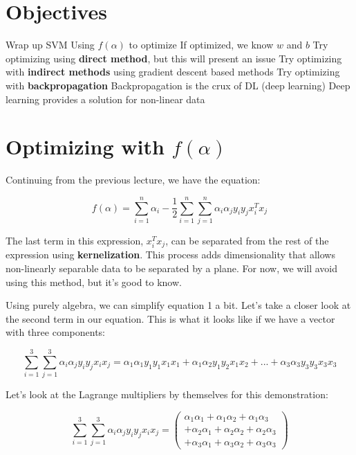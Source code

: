 \section*{Objectives}
\begin{outline}
    \1 Wrap up SVM
    \1 Using $f(\alpha)$ to optimize
        \2 If optimized, we know $w$ and $b$
    \1 Try optimizing using \textbf{direct method}, but this will present an issue
    \1 Try optimizing with \textbf{indirect methods} using gradient descent based methods
    \1 Try optimizing with \textbf{backpropagation}
        \2 Backpropagation is the crux of DL (deep learning)
        \2 Deep learning provides a solution for non-linear data 

\end{outline}

\section*{Optimizing with $f(\alpha)$}

Continuing from the previous lecture, we have the equation:

\begin{equation}
f(\alpha) = \sum\limits_{i=1}^{n} \alpha_i - \frac{1}{2} \sum\limits_{i=1}^{n} \sum\limits_{j=1}^{n} \alpha_i \alpha_j y_i y_j x_i^T x_j
\end{equation}

The last term in this expression, $x_i^T x_j$, can be separated from the rest of the expression using \textbf{kernelization}. This process adds dimensionality that allows non-linearly separable data to be separated by a plane. For now, we will avoid using this method, but it's good to know.

Using purely algebra, we can simplify equation 1 a bit. Let's take a closer look at the second term in our equation. This is what it looks like if we have a vector with three components:

\[
\sum\limits_{i=1}^{3} \sum\limits_{j=1}^{3} \alpha_i \alpha_j y_i y_j x_i x_j = \alpha_1\alpha_1y_1y_1x_1x_1 + \alpha_1\alpha_2y_1y_2x_1x_2 + ... + \alpha_3\alpha_3y_3y_3x_3x_3
\]

Let's look at the Lagrange multipliers by themselves for this demonstration:

\[
\sum\limits_{i=1}^{3} \sum\limits_{j=1}^{3} \alpha_i \alpha_j y_i y_j x_i x_j = 
\begin{pmatrix}
\alpha_1\alpha_1 + \alpha_1\alpha_2 + \alpha_1\alpha_3 
\\
+ \alpha_2\alpha_1 + \alpha_2\alpha_2 + \alpha_2\alpha_3 
\\
+ \alpha_3\alpha_1 + \alpha_3\alpha_2 + \alpha_3\alpha_3
\end{pmatrix}
\]

